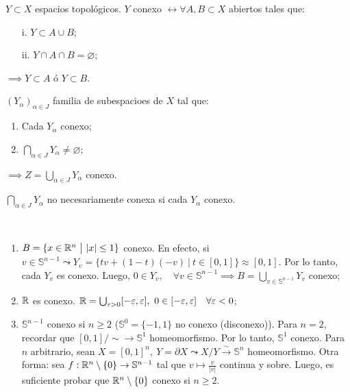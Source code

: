 \begin{lemma}
	$Y \subset X$ espacios topológicos. $Y$ conexo $\longleftrightarrow \forall A,B \subset X$ abiertos tales que:
	\begin{enumerate}
		\item[i.] $Y \subset A \cup B$;

		\item[ii.] $Y \cap A \cap B = \varnothing$;
	\end{enumerate}
	$\implies Y \subset A$ ó $Y \subset B$.
\end{lemma}
\begin{criterio}[Conexidad]
$(Y_{\alpha})_{\alpha \in J}$ familia de subespacioes de $X$ tal que:
\begin{enumerate}
	\item Cada $Y_{\alpha}$ conexo;

	\item $\bigcap_{\alpha \in J} Y_{\alpha} \neq \varnothing$;
\end{enumerate}
$\implies Z = \bigcup_{\alpha \in J} Y_{\alpha}$ conexo.\par
\end{criterio}
\medskip
\begin{remark}
	$\bigcap_{\alpha \in J} Y_{\alpha}$ no necesariamente conexa si cada $Y_{\alpha}$ conexo.
\end{remark}
\smallskip
\begin{eg}~
	\begin{enumerate}
		\item $B = \{x \in \mathbb{R}^n \ \big| \ |x| \leq 1\}$ conexo. En efecto, si $v \in \mathbb{S}^{n-1} \leadsto Y_v = \{tv + (1-t)(-v) \ \big| \ t \in [0,1]\} \approx [0,1]$. Por lo tanto, cada $Y_v$ es conexo. Luego, $0 \in Y_v, \quad \forall v \in \mathbb{S}^{n-1} \implies B = \bigcup_{v \in \mathbb{S}^{n-1}} Y_v$ conexo;

		\item $\mathbb{R}$ es conexo. $\mathbb{R} = \bigcup_{\varepsilon>0} [-\varepsilon,\varepsilon],\ 0 \in [-\varepsilon,\varepsilon]\quad \forall \varepsilon < 0$;

		\item $\mathbb{S}^{n-1}$ conexo si $n\geq 2$ ($\mathbb{S}^{0} = \{-1,1\}$ no conexo (disconexo)). Para $n=2$, recordar que $[0,1] / \sim \to \mathbb{S}^{1}$ homeomorfismo. Por lo tanto, $\mathbb{S}^{1}$ conexo. Para $n$ arbitrario, sean $X = [0,1]^n,\ Y = \partial X \leadsto X / Y \stackrel{\sim}{\longrightarrow} \mathbb{S}^{n}$ homeomorfismo. Otra forma: sea $f: \mathbb{R}^n \setminus \{0\} \to \mathbb{S}^{n-1}$ tal que $v \mapsto \frac{v}{|v|}$ continua y sobre. Luego, es suficiente probar que $\mathbb{R}^n \setminus \{0\}$ conexo si $n \geq 2$.  
	\end{enumerate}
\end{eg}
